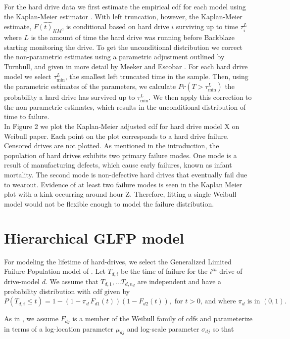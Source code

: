 \documentclass[12pt]{article}
\begin{document}
For the hard drive data we first estimate the empirical cdf for each model using the Kaplan-Meier estimator \cite{kaplan}.  With left truncation, however, the Kaplan-Meier estimate, $\widehat{F(t)_{KM}}$, is conditional based on hard drive $i$ surviving up to time $\tau_i^L$ where $L$ is the amount of time the hard drive was running before Backblaze starting monitoring the drive.  To get the unconditional distribution we correct the non-parametric estimates using a parametric adjustment outlined by Turnbull, and given in more detail by Meeker and Escobar \cite{turnbull,meeker}.  For each hard drive model we select $\tau_{\text{min}}^L$, the smallest left truncated time in the sample.  Then, using the parametric estimates of the parameters, we calculate $Pr(T>\tau_\text{min}^L)$ the probability a hard drive has survived up to $\tau_{\text{min}}^L$.  We then apply this correction to the non parametric estimates, which results in the unconditional distribution of time to failure.\\

In Figure 2 we plot the Kaplan-Meier adjusted cdf for hard drive model X on Weibull paper.  Each point on the plot corresponds to a hard drive failure.  Censored drives are not plotted.  As mentioned in the introduction, the population of hard drives exhibits two primary failure modes.  One mode is a result of manufacturing defects, which cause early failures, known as infant mortality.  The second mode is non-defective hard drives that eventually fail due to wearout.   Evidence of at least two failure modes is seen in the Kaplan Meier plot with a kink occurring around hour Z.  Therefore, fitting a single Weibull model would not be flexible enough to model the failure distribution.


\section{Hierarchical GLFP model}
For modeling the lifetime of hard-drives, we select the Generalized Limited Failure Population model of \citet{chan}.
Let $T_{d,i}$ be the time of failure for the $i^{th}$ drive of drive-model $d$.
We assume that $T_{d,1},\ldots T_{d,n_d}$ are independent and have a probability distribution with cdf given by
$$P(T_{d,i}\le t) = 1 - (1-\pi_d\, F_{d1}(t))(1 - F_{d2}(t)), \mbox{ for }t>0 \mbox{, and where } \pi_d \mbox{ is in }(0,1).$$

As in \cite{chan}, we assume $F_{dj}$ is a member of the Weibull family of cdfs and parameterize in terms of a log-location parameter $\mu_{dj}$ and log-scale parameter $\sigma_{dj}$ so that
\end{document}
